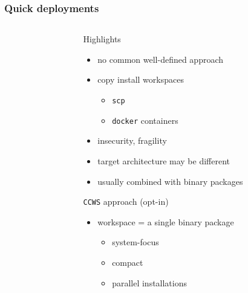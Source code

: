 \documentclass[hyperref={colorlinks=false, breaklinks=true},11pt]{beamer}
\begin{document}
\begin{frame}
    \frametitle{Quick deployments}

    \begin{columns}[T]
        \begin{column}{.29\textwidth}
        \end{column}
        \begin{column}{.69\textwidth}
            \begin{block}{Highlights}
                \begin{itemize}
                    \item no common well-defined approach
                    \item copy install workspaces
                        \begin{itemize}
                            \item \texttt{scp}
                            \item \texttt{docker} containers
                        \end{itemize}
                    \item insecurity, fragility
                    \item target architecture may be different
                    \item usually combined with binary packages
                \end{itemize}
            \end{block}

            \begin{block}{\texttt{CCWS} approach (opt-in)}
                \begin{itemize}
                    \item workspace = a single binary package
                        \begin{itemize}
                            \item system-focus
                            \item compact
                            \item parallel installations
                        \end{itemize}
                \end{itemize}
            \end{block}
        \end{column}
    \end{columns}
\end{frame}
\end{document}
